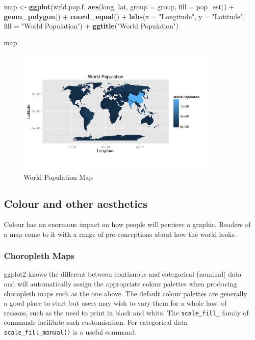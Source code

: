 \documentclass[]{article}
\newenvironment{Shaded}{}{}
\newcommand{\KeywordTok}[1]{\textcolor[rgb]{0.00,0.44,0.13}{\textbf{{#1}}}}
\newcommand{\DataTypeTok}[1]{\textcolor[rgb]{0.56,0.13,0.00}{{#1}}}
\newcommand{\StringTok}[1]{\textcolor[rgb]{0.25,0.44,0.63}{{#1}}}
\newcommand{\NormalTok}[1]{{#1}}
\let\Oldincludegraphics\includegraphics
\renewcommand{\includegraphics}[1]{\Oldincludegraphics[width=10cm]{#1}}
\begin{document}
\begin{Shaded}
\begin{Highlighting}[]
\NormalTok{map <- }\KeywordTok{ggplot}\NormalTok{(wrld.pop.f, }\KeywordTok{aes}\NormalTok{(long, lat, }\DataTypeTok{group =} \NormalTok{group, }\DataTypeTok{fill =} \NormalTok{pop_est)) + }\KeywordTok{geom_polygon}\NormalTok{() + }
    \KeywordTok{coord_equal}\NormalTok{() + }\KeywordTok{labs}\NormalTok{(}\DataTypeTok{x =} \StringTok{"Longitude"}\NormalTok{, }\DataTypeTok{y =} \StringTok{"Latitude"}\NormalTok{, }\DataTypeTok{fill =} \StringTok{"World Population"}\NormalTok{) + }
    \KeywordTok{ggtitle}\NormalTok{(}\StringTok{"World Population"}\NormalTok{)}

\NormalTok{map}
\end{Highlighting}
\end{Shaded}
\begin{figure}[htbp]
\centering
\includegraphics{figure/World_Population_Map.png}
\caption{World Population Map}
\end{figure}

\subsection{Colour and other aesthetics}

Colour has an enormous impact on how people will percieve a graphic.
Readers of a map come to it with a range of pre-conceptions about how
the world looks.

\subsubsection{Choropleth Maps}

ggplot2 knows the different between continuous and categorical (nominal)
data and will automatically assign the appropriate colour palettes when
producing choropleth maps such as the one above. The default colour
palettes are generally a good place to start but users may wish to vary
them for a whole host of reasons, such as the need to print in black and
white. The \texttt{scale\_fill\_} family of commands facilitate such
customisation. For categorical data \texttt{scale\_fill\_manual()} is a
useful command:
\end{document}
